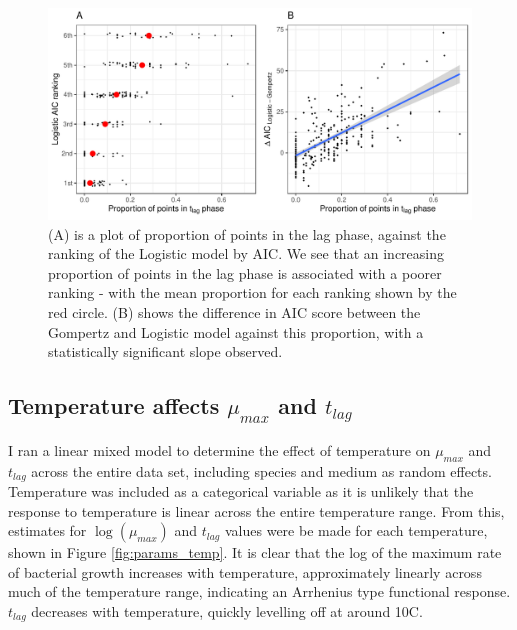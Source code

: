 \documentclass[11pt, a4paper]{article}
\begin{document}
\begin{linenumbers}
                \begin{figure}[H]
        \includegraphics[width=\linewidth]{../results/tlag_vs_logistic.pdf}
        \caption{(A) is a plot of proportion of points in the lag phase, against the ranking of the Logistic model by AIC. We see that an increasing proportion of points in the lag phase is associated with a poorer ranking - with the mean proportion for each ranking shown by the red circle. (B) shows the difference in AIC score between the Gompertz and Logistic model against this proportion, with a statistically significant slope observed.}
        \label{fig:logistic_tlag}
        \end{figure}        
        
        \subsection{Temperature affects $\mu_{max}$ and $t_{lag}$}
        
         I ran a linear mixed model to determine the effect of temperature on $\mu_{max}$ and $t_{lag}$ across the entire data set, including species and medium as random effects. Temperature was included as a categorical variable as it is unlikely that the response to temperature is linear across the entire temperature range. From this, estimates for $\log(\mu_{max})$ and $t_{lag}$ values were be made for each temperature, shown in Figure \ref{fig:params_temp}. It is clear that the log of the maximum rate of bacterial growth increases with temperature, approximately linearly across much of the temperature range, indicating an Arrhenius type functional response. $t_{lag}$ decreases with temperature, quickly levelling off at around 10\degree C. 


\end{linenumbers}
\end{document}
